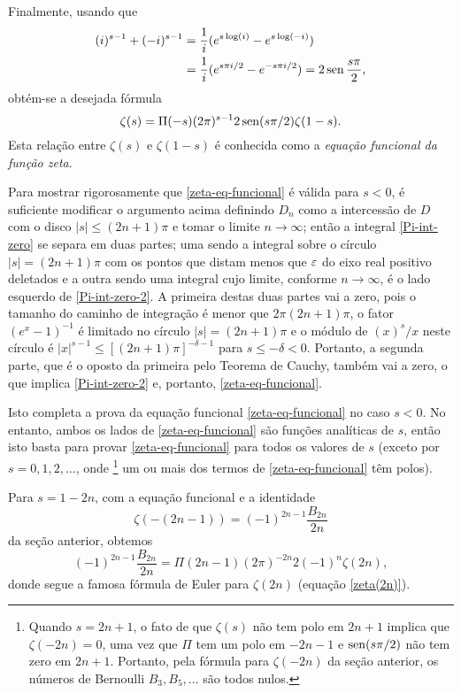     Finalmente, usando que
    \begin{align*}
        (i)^{s-1} + (-i)^{s-1} & = \frac{1}{i}(e^{s \log (i)} - e^{s \log (-i)}) \\
        &= \frac{1}{i}(e^{s \pi i/2} - e^{-s \pi i/2}) = 2 \operatorname{sen} \frac{s\pi}{2},
    \end{align*}
    obtém-se a desejada fórmula
    \begin{equation}
        \label{zeta-eq-funcional}
        \zeta(s) = \Pi(-s) (2\pi)^{s-1} 2 \operatorname{sen} (s\pi/2)\zeta(1-s).
    \end{equation}
    Esta relação entre $\zeta(s)$ e $\zeta(1-s)$ é conhecida como a \textit{equação funcional da função zeta}.
    
    Para mostrar rigorosamente que \eqref{zeta-eq-funcional} é válida para $s<0$, é suficiente modificar o argumento acima definindo $D_n$ como a intercessão de $D$ com o disco $|s| \leq (2n+1)\pi$ e tomar o limite $n \to \infty$; então a integral  \eqref{Pi-int-zero} se separa em duas partes; uma sendo a integral sobre o círculo $|s| = (2n + 1)\pi$ com os pontos que distam menos que $\varepsilon$ do eixo real positivo deletados e a outra sendo uma integral cujo limite, conforme $n \to \infty$, é o lado esquerdo de \eqref{Pi-int-zero-2}. A primeira destas duas partes vai a zero, pois o tamanho do caminho de integração é menor que $2\pi (2n+1)\pi$, o fator $(e^x - 1)^{-1}$ é limitado no círculo $|s| = (2n + 1)\pi$ e o módulo de $(x)^s/x$ neste círculo é $|x|^{s-1} \leq [(2n + 1)\pi]^{-\delta -1}$ para $s \leq - \delta < 0$. Portanto, a segunda parte, que é o oposto da primeira pelo Teorema de Cauchy, também vai a zero, o que implica \eqref{Pi-int-zero-2} e, portanto, \eqref{zeta-eq-funcional}.
    
    Isto completa a prova da equação funcional \eqref{zeta-eq-funcional} no caso $s < 0$. No entanto, ambos os lados de \eqref{zeta-eq-funcional} são funções analíticas de $s$, então isto basta para provar \eqref{zeta-eq-funcional} para todos os valores de $s$ (exceto por $s = 0, 1, 2, \dots $, onde 
    \footnote{ Quando $s = 2n + 1$, o fato de que $\zeta(s)$ não tem polo em $2n + 1$ implica que $\zeta(-2n) = 0$, uma vez que $\Pi$ tem um polo em $-2n-1$ e $\operatorname{sen} (s\pi/2)$ não tem zero em $2n + 1$. Portanto, pela fórmula para $\zeta(-2n)$ da seção anterior, os números de Bernoulli $B_3, B_5, \dots$ são todos nulos.
    }
    um ou mais dos termos de \eqref{zeta-eq-funcional} têm polos).
    
    Para $s = 1-2n$, com a equação funcional e a identidade
    \begin{equation*}
        \zeta(-(2n-1)) = (-1)^{2n-1} \frac{B_{2n}}{2n}
    \end{equation*}
    da seção anterior, obtemos
    \begin{equation*}
        (-1)^{2n-1} \frac{B_{2n}}{2n} = \Pi(2n-1) (2\pi)^{-2n} 2 (-1)^n \zeta(2n),
    \end{equation*}
    donde segue a famosa fórmula de Euler para $\zeta(2n)$ (equação \eqref{zeta(2n)}).
    
